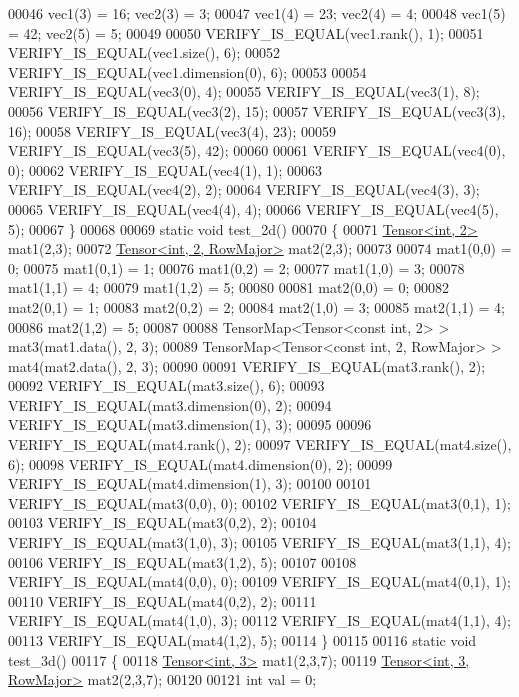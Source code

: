 \begin{DoxyCode}
00046   vec1(3) = 16; vec2(3) = 3;
00047   vec1(4) = 23; vec2(4) = 4;
00048   vec1(5) = 42; vec2(5) = 5;
00049 
00050   VERIFY\_IS\_EQUAL(vec1.rank(), 1);
00051   VERIFY\_IS\_EQUAL(vec1.size(), 6);
00052   VERIFY\_IS\_EQUAL(vec1.dimension(0), 6);
00053 
00054   VERIFY\_IS\_EQUAL(vec3(0), 4);
00055   VERIFY\_IS\_EQUAL(vec3(1), 8);
00056   VERIFY\_IS\_EQUAL(vec3(2), 15);
00057   VERIFY\_IS\_EQUAL(vec3(3), 16);
00058   VERIFY\_IS\_EQUAL(vec3(4), 23);
00059   VERIFY\_IS\_EQUAL(vec3(5), 42);
00060 
00061   VERIFY\_IS\_EQUAL(vec4(0), 0);
00062   VERIFY\_IS\_EQUAL(vec4(1), 1);
00063   VERIFY\_IS\_EQUAL(vec4(2), 2);
00064   VERIFY\_IS\_EQUAL(vec4(3), 3);
00065   VERIFY\_IS\_EQUAL(vec4(4), 4);
00066   VERIFY\_IS\_EQUAL(vec4(5), 5);
00067 \}
00068 
00069 \textcolor{keyword}{static} \textcolor{keywordtype}{void} test\_2d()
00070 \{
00071   \hyperlink{class_eigen_1_1_tensor}{Tensor<int, 2>} mat1(2,3);
00072   \hyperlink{class_eigen_1_1_tensor}{Tensor<int, 2, RowMajor>} mat2(2,3);
00073 
00074   mat1(0,0) = 0;
00075   mat1(0,1) = 1;
00076   mat1(0,2) = 2;
00077   mat1(1,0) = 3;
00078   mat1(1,1) = 4;
00079   mat1(1,2) = 5;
00080 
00081   mat2(0,0) = 0;
00082   mat2(0,1) = 1;
00083   mat2(0,2) = 2;
00084   mat2(1,0) = 3;
00085   mat2(1,1) = 4;
00086   mat2(1,2) = 5;
00087 
00088   TensorMap<Tensor<const int, 2> > mat3(mat1.data(), 2, 3);
00089   TensorMap<Tensor<const int, 2, RowMajor> > mat4(mat2.data(), 2, 3);
00090 
00091   VERIFY\_IS\_EQUAL(mat3.rank(), 2);
00092   VERIFY\_IS\_EQUAL(mat3.size(), 6);
00093   VERIFY\_IS\_EQUAL(mat3.dimension(0), 2);
00094   VERIFY\_IS\_EQUAL(mat3.dimension(1), 3);
00095 
00096   VERIFY\_IS\_EQUAL(mat4.rank(), 2);
00097   VERIFY\_IS\_EQUAL(mat4.size(), 6);
00098   VERIFY\_IS\_EQUAL(mat4.dimension(0), 2);
00099   VERIFY\_IS\_EQUAL(mat4.dimension(1), 3);
00100 
00101   VERIFY\_IS\_EQUAL(mat3(0,0), 0);
00102   VERIFY\_IS\_EQUAL(mat3(0,1), 1);
00103   VERIFY\_IS\_EQUAL(mat3(0,2), 2);
00104   VERIFY\_IS\_EQUAL(mat3(1,0), 3);
00105   VERIFY\_IS\_EQUAL(mat3(1,1), 4);
00106   VERIFY\_IS\_EQUAL(mat3(1,2), 5);
00107 
00108   VERIFY\_IS\_EQUAL(mat4(0,0), 0);
00109   VERIFY\_IS\_EQUAL(mat4(0,1), 1);
00110   VERIFY\_IS\_EQUAL(mat4(0,2), 2);
00111   VERIFY\_IS\_EQUAL(mat4(1,0), 3);
00112   VERIFY\_IS\_EQUAL(mat4(1,1), 4);
00113   VERIFY\_IS\_EQUAL(mat4(1,2), 5);
00114 \}
00115 
00116 \textcolor{keyword}{static} \textcolor{keywordtype}{void} test\_3d()
00117 \{
00118   \hyperlink{class_eigen_1_1_tensor}{Tensor<int, 3>} mat1(2,3,7);
00119   \hyperlink{class_eigen_1_1_tensor}{Tensor<int, 3, RowMajor>} mat2(2,3,7);
00120 
00121   \textcolor{keywordtype}{int} val = 0;

\end{DoxyCode}
